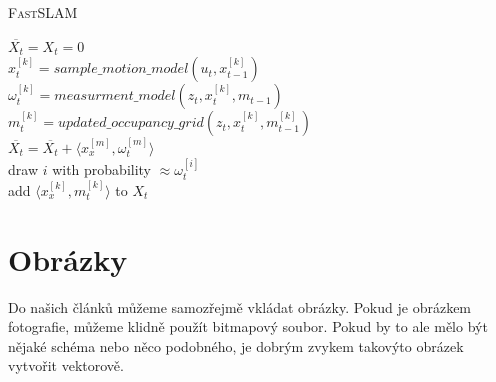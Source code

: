 \documentclass[a4paper,11pt]{article}
\begin{document}
\begin{algorithm}[H]
\caption{\textsc{Fast}\uppercase{slam}}
\label{algoritmus1}
\SetAlgoNoLine
\SetNlSty{}{}{:}
\SetInd{1em}{1em}
\SetNlSkip{-1.4em}
\BlankLine
\Indp
\Indp
 $\overline{X_{t}}=X_{t}=0$\\
{$x^{[k]}_{t} = sample\_motion\_model(u_{t},x^{[k]}_{t-1})$\\
$\omega^{[k]}_{t} = measurment\_model(z_{t},x^{[k]}_{t},m_{t-1})$\\
 $m^{[k]}_{t} = updated\_occupancy\_grid(z_{t},x^{[k]}_{t},m^{[k]}_{t-1})$\\
 $\overline{X_{t}} = \overline{X_{t}} + \langle x^{[m]}_{x},\omega^{[m]}_{t}\rangle$\\}
{ draw $i$ with probability $\approx \omega^{[i]}_{t}$\\
 add $\langle x^{[k]}_{x},m^{[k]}_{t}\rangle$ to $X_{t}$}
\end{algorithm}
\vspace{7mm}


\section{Obrázky}
Do našich článků můžeme samozřejmě vkládat obrázky. Pokud je obrázkem fotografie,	
můžeme klidně použít bitmapový soubor. Pokud by to ale mělo být nějaké schéma nebo
něco podobného, je dobrým zvykem takovýto obrázek vytvořit vektorově.
\end{document}
